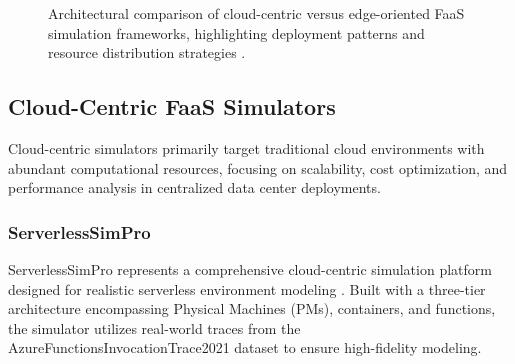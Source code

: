 \begin{figure}[htbp]
\centering
{}
\caption{Architectural comparison of cloud-centric versus edge-oriented FaaS simulation frameworks, highlighting deployment patterns and resource distribution strategies \cite{boughzala2022faassim, das2022serverlesssimpro}.}
\label{fig:simulator-architecture-comparison}
\end{figure}


\subsection{Cloud-Centric FaaS Simulators}

Cloud-centric simulators primarily target traditional cloud environments with abundant computational resources, focusing on scalability, cost optimization, and performance analysis in centralized data center deployments.

\subsubsection{ServerlessSimPro}

ServerlessSimPro represents a comprehensive cloud-centric simulation platform designed for realistic serverless environment modeling \cite{das2022serverlesssimpro}. Built with a three-tier architecture encompassing Physical Machines (PMs), containers, and functions, the simulator utilizes real-world traces from the AzureFunctionsInvocationTrace2021 dataset to ensure high-fidelity modeling.

